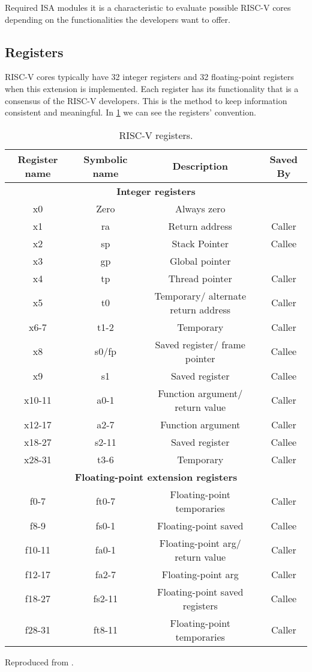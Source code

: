Required \gls{ISA} modules it is a characteristic to evaluate possible RISC-V cores depending on the functionalities the developers want to offer.

\subsection{Registers}
RISC-V cores typically have 32 integer registers and 32 floating-point registers when this extension is implemented. Each register has its functionality that is a consensus of the RISC-V developers. This is the method to keep information consistent and meaningful. In \ref{tab:riscreg} we can see the registers' convention.


\begin{table}[H]
\centering
\begin{tabular}{|c|c|c|c|}
\hline
\textbf{Register name} & \textbf{Symbolic name} & \textbf{Description}  & \textbf{Saved By}  \\ \hline
\multicolumn{4}{|c|}{\textbf{Integer registers}} \\ \hline
x0 & Zero & Always zero & \\ \hline
x1 & ra & Return address & Caller \\ \hline
x2 & sp & Stack Pointer & Callee \\ \hline
x3 & gp & Global pointer &  \\ \hline
x4 & tp & Thread pointer & Caller \\ \hline
x5 & t0 & Temporary/ alternate return address & Caller \\ \hline
x6-7 & t1-2  & Temporary & Caller \\ \hline
x8 & s0/fp & Saved register/ frame pointer & Callee \\ \hline
x9 & s1 & Saved register & Callee \\ \hline
x10-11 & a0-1 & Function argument/ return value & Caller \\ \hline
x12-17 & a2-7 & Function argument & Caller \\ \hline
x18-27 & s2-11 & Saved register & Callee \\ \hline
x28-31 & t3-6 & Temporary & Caller \\ \hline
\multicolumn{4}{|c|}{\textbf{Floating-point extension registers}} \\ \hline
f0-7 & ft0-7 & Floating-point temporaries & Caller \\ \hline
f8-9 & fs0-1 & Floating-point saved & Callee \\ \hline
f10-11 & fa0-1 & Floating-point arg/ return value & Caller \\ \hline
f12-17 & fa2-7 & Floating-point arg & Caller \\ \hline
f18-27 & fs2-11 & Floating-point saved registers & Callee \\ \hline
f28-31 & ft8-11 & Floating-point temporaries & Caller \\ \hline
\end{tabular}
\caption{RISC-V registers.} Reproduced from \cite{riscvg}.
\label{tab:riscreg}
\end{table}

